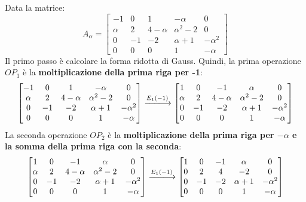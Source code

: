 \documentclass[a4paper]{article}
\makeatletter
\newenvironment{rowequmatbra}[1]{\left[\array{@{}#1@{}}}{\endarray\right]}
\makeatother
\begin{document}
	Data la matrice:
	\begin{equation*}
		A_{\alpha} = \begin{bmatrix}
			-1		& 0 	& 1			& -\alpha		& 0				\\
			\alpha 	& 2 	& 4-\alpha	& \alpha^{2}-2	& 0				\\
			0 		& -1	& -2		& \alpha+1		& -\alpha^{2}	\\
			0		& 0		& 0			& 1				& -\alpha
		\end{bmatrix}
	\end{equation*}
	Il \textcolor{Red3}{primo passo} è calcolare la forma ridotta di Gauss. Quindi, la prima operazione $OP_{1}$ è la \textbf{moltiplicazione della prima riga per -1}:
	\begin{equation*}
		\begin{bmatrix}
			-1		& 0 	& 1			& -\alpha		& 0				\\
			\alpha 	& 2 	& 4-\alpha	& \alpha^{2}-2	& 0				\\
			0 		& -1	& -2		& \alpha+1		& -\alpha^{2}	\\
			0		& 0		& 0			& 1				& -\alpha
		\end{bmatrix} \xlongrightarrow{E_{1}\left(-1\right)}
		\begin{rowequmatbra}{ccccc}
			1		& 0 	& -1		& \alpha		& 0				\\
			\alpha 	& 2 	& 4-\alpha	& \alpha^{2}-2	& 0				\\
			0 		& -1	& -2		& \alpha+1		& -\alpha^{2}	\\
			0		& 0		& 0			& 1				& -\alpha
		\end{rowequmatbra}
	\end{equation*}
	La seconda operazione $OP_{2}$ è la \textbf{moltiplicazione della prima riga per $-\alpha$ e la somma della prima riga con la seconda}:
	\begin{equation*}
		\begin{rowequmatbra}{ccccc}
			1		& 0 	& -1		& \alpha		& 0				\\
			\alpha 	& 2 	& 4-\alpha	& \alpha^{2}-2	& 0				\\
			0 		& -1	& -2		& \alpha+1		& -\alpha^{2}	\\
			0		& 0		& 0			& 1				& -\alpha
		\end{rowequmatbra} \xlongrightarrow{E_{1}\left(-1\right)}
		\begin{rowequmatbra}{ccccc}
			1		& 0 	& -1		& \alpha		& 0				\\
			0		& 2 	& 4			& -2			& 0				\\
			0 		& -1	& -2		& \alpha+1		& -\alpha^{2}	\\
			0		& 0		& 0			& 1				& -\alpha
		\end{rowequmatbra}
	\end{equation*}
\end{document}
